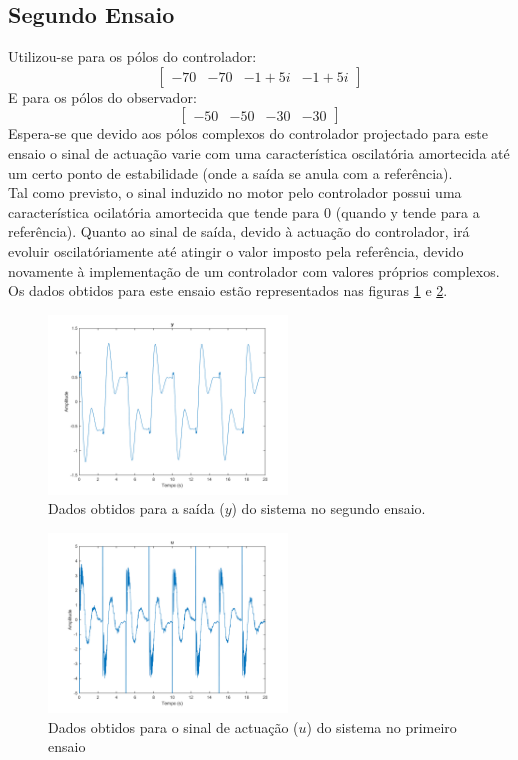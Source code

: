 \documentclass[%
  reprint,
  nofootinbib,
  amsmath,amssymb,
  aps,
  10pt,
  a4paper
]{revtex4-1}
\begin{document}
\subsection{Segundo Ensaio}
Utilizou-se para os pólos do controlador:
\begin{equation}
\begin{bmatrix}
-70 & -70  & -1+5i &-1+5i
\end{bmatrix}
\end{equation}
E para os pólos do observador:
\begin{equation}
\begin{bmatrix}
-50 & -50  & -30 &-30
\end{bmatrix}
\end{equation}
Espera-se que devido aos pólos complexos do controlador projectado para este ensaio o sinal de actuação varie com uma característica oscilatória amortecida até um certo ponto de estabilidade (onde a saída se anula com a referência).\\
Tal como previsto, o sinal induzido no motor pelo controlador possui uma característica ocilatória amortecida que tende para 0 (quando y tende para a referência).
Quanto ao sinal de saída, devido à actuação do controlador, irá evoluir oscilatóriamente até atingir o valor imposto pela referência, devido novamente à implementação de um controlador com valores próprios complexos.
Os dados obtidos para este ensaio estão representados nas figuras \ref{fig:y_seg} e \ref{fig:u_seg}.
\begin{figure}[H]
\includegraphics[width=2.5in]{../imgs/dados_00_c/dados_00_c_y.png}
\caption{Dados obtidos para a saída ($y$) do sistema no segundo ensaio.}
\label{fig:y_seg}
\end{figure}
\begin{figure}[H]
\includegraphics[width=2.5in]{../imgs/dados_00_c/dados_00_c_u.png}
\caption{Dados obtidos para o sinal de actuação ($u$) do sistema no primeiro ensaio}
\label{fig:u_seg}
\end{figure}
\end{document}
